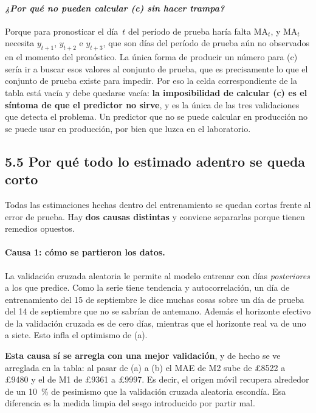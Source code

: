 \documentclass[11pt]{article}
\newcommand{\gbp}{\pounds}
\begin{document}
\paragraph{{\normalfont\itshape ¿Por qu\'e no pueden calcular (c) sin hacer
trampa?}} Porque para pronosticar el d\'ia~$t$ del per\'iodo de prueba
har\'ia falta $\mathrm{MA}_t$, y $\mathrm{MA}_t$ necesita $y_{t+1}$,
$y_{t+2}$ e $y_{t+3}$, que son d\'ias del per\'iodo de prueba a\'un no
observados en el momento del pron\'ostico. La \'unica forma de producir un
n\'umero para (c) ser\'ia ir a buscar esos valores al conjunto de prueba, que
es precisamente lo que el conjunto de prueba existe para impedir. Por eso la
celda correspondiente de la tabla est\'a vac\'ia y debe quedarse vac\'ia:
\textbf{la imposibilidad de calcular (c) es el s\'intoma de que el predictor
no sirve}, y es la \'unica de las tres validaciones que detecta el
problema. Un predictor que no se puede calcular en producci\'on no se puede
usar en producci\'on, por bien que luzca en el laboratorio.

\subsection{5.5 Por qu\'e todo lo estimado adentro se queda corto}

Todas las estimaciones hechas dentro del entrenamiento se quedan cortas
frente al error de prueba. Hay \textbf{dos causas distintas} y conviene
separarlas porque tienen remedios opuestos.

\paragraph{Causa 1: c\'omo se partieron los datos.} La validaci\'on cruzada
aleatoria le permite al modelo entrenar con d\'ias \emph{posteriores} a los
que predice. Como la serie tiene tendencia y autocorrelaci\'on, un d\'ia de
entrenamiento del 15 de septiembre le dice muchas cosas sobre un d\'ia de
prueba del 14 de septiembre que no se sabr\'ian de antemano. Adem\'as el
horizonte efectivo de la validaci\'on cruzada es de cero d\'ias, mientras que
el horizonte real va de uno a siete. Esto infla el optimismo de (a).

\textbf{Esta causa s\'i se arregla con una mejor validaci\'on}, y de hecho se
ve arreglada en la tabla: al pasar de (a) a (b) el MAE de M2 sube de
\gbp\num{8522} a \gbp\num{9480} y el de M1 de \gbp\num{9361} a
\gbp\num{9997}. Es decir, el origen m\'ovil recupera alrededor de un
\SI{10}{\percent} de pesimismo que la validaci\'on cruzada aleatoria
escond\'ia. Esa diferencia es la medida limpia del sesgo introducido por
partir mal.
\end{document}
